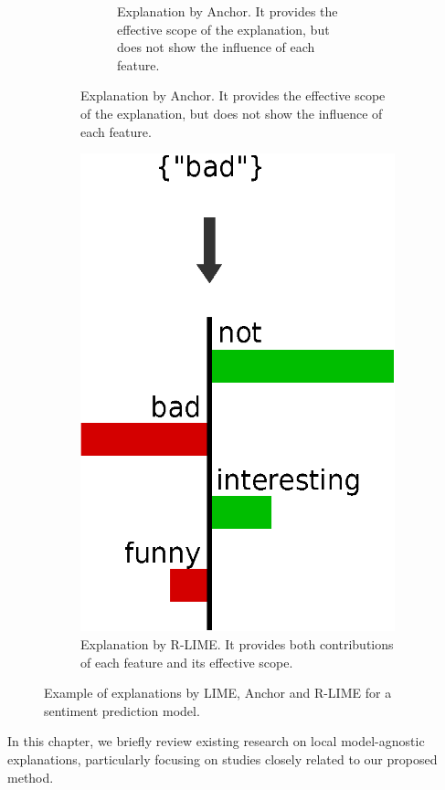 \documentclass[runningheads]{llncs}
\begin{document}
\begin{figure}[t]
\begin{subfigure}[t]{0.45\textwidth}
\begin{subfigure}[t]{\textwidth}
			\caption{%
				Explanation by Anchor.
				It provides the effective scope of the explanation,
				but does not show the influence of each feature.
			}\label{fig:example-anchor}
		\end{subfigure}
	\end{subfigure}
	\hspace{0.3cm}
	\begin{subfigure}[t]{0.45\textwidth}
		\centering
		\vspace{-2.05cm}
		\includegraphics[scale=0.35]{example-rlime}
		\caption{%
			Explanation by R-LIME\@.
			It provides both contributions of each feature and
			its effective scope.
		}\label{fig:example-rlime}
	\end{subfigure}
	\caption{%
		Example of explanations by LIME, Anchor and R-LIME
		for a sentiment prediction model.
	}\label{fig:example}
\end{figure}
In this chapter,
we briefly review existing research on local model-agnostic explanations,
particularly focusing on studies closely related to our proposed method.
\end{document}
